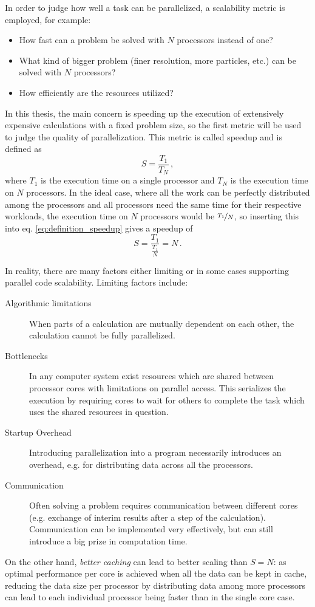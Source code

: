 \documentclass[main.tex]{subfiles}
\begin{document}

In order to judge how well a task can be parallelized, a scalability metric is employed, for example:
\begin{itemize}
    \item How fast can a problem be solved with \(N\) processors instead of one?
    \item What kind of bigger problem (finer resolution, more particles, etc.) can be solved with \(N\) processors?
    \item How efficiently are the resources utilized?
\end{itemize}
In this thesis, the main concern is speeding up the execution of extensively expensive calculations with a fixed problem size, so the first metric will be used to judge the quality of parallelization.
This metric is called speedup and is defined as 
\begin{equation}\label{eq:definition_speedup}
    S = \frac{T_1}{T_N}\,, 
\end{equation}
where \(T_1\) is the execution time on a single processor and \(T_N\) is the execution time on \(N\) processors.
In the ideal case, where all the work can be perfectly distributed among the processors and all processors need the same time for their respective workloads, the execution time on \(N\) processors would be \(\nicefrac{T_1}{N}\), so inserting this into eq. \ref{eq:definition_speedup} gives a speedup of
\begin{equation}\label{eq:ideal_speedup}
    S = \frac{T_1}{\frac{T_1}{N}} = N\,.
\end{equation}

In reality, there are many factors either limiting or in some cases supporting parallel code scalability. Limiting factors include:
\begin{description}
    \item[Algorithmic limitations] When parts of a calculation are mutually dependent on each other, the calculation cannot be fully parallelized.
    \item[Bottlenecks] In any computer system exist resources which are shared between processor cores with limitations on parallel access. This serializes the execution by requiring cores to wait for others to complete the task which uses the shared resources in question.
    \item[Startup Overhead] Introducing parallelization into a program necessarily introduces an overhead, e.g. for distributing data across all the processors.
    \item[Communication] Often solving a problem requires communication between different cores (e.g. exchange of interim results after a step of the calculation). Communication can be implemented very effectively, but can still introduce a big prize in computation time.
\end{description}
On the other hand, \emph{better caching} can lead to better scaling than \(S = N\): as optimal performance per core is achieved when all the data can be kept in cache, reducing the data size per processor by distributing data among more processors can lead to each individual processor being faster than in the single core case.
\end{document}
